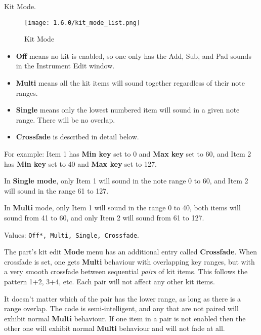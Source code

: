    Kit Mode.

\begin{figure}[H]
   \centering
   \texttt{[image: 1.6.0/kit\_mode\_list.png]}
   \caption{Kit Mode}
   \label{fig:kit_mode_list}
\end{figure}

   \begin{itemize}
      \item \textbf{Off} means no kit is enabled, so one only has the Add,
         Sub, and Pad sounds in the Instrument Edit window.
      \item \textbf{Multi} means all the kit items will sound together
         regardless of their note ranges.
      \item \textbf{Single} means only the lowest numbered item will sound
         in a given note range. There will be no overlap.
      \item \textbf{Crossfade} is described in detail below.
   \end{itemize}

   For example:
   Item 1 has \textbf{Min key} set to 0 and \textbf{Max key} set to 60, and
   Item 2 has \textbf{Min key} set to 40 and \textbf{Max key} set to 127.

   In \textbf{Single mode}, only Item 1 will sound in the note range 0 to
   60, and Item 2 will sound in the range 61 to 127.

   In \textbf{Multi} mode, only Item 1 will sound in the range 0 to 40, both
   items will sound from 41 to 60, and only Item 2 will sound from 61 to
   127.

   Values: \texttt{Off*, Multi, Single, Crossfade}.

   The part's kit edit \textbf{Mode} menu has an additional entry
   called \textbf{Crossfade}.
   When crossfade is set, one gets \textbf{Multi} behaviour with overlapping key
   ranges, but with a very smooth crossfade between sequential \textsl{pairs}
   of kit items. This follows the pattern 1+2, 3+4, etc. Each pair will not
   affect any other kit items.

   It doesn't matter which of the pair has the lower range, as long as there is
   a range overlap. The code is semi-intelligent, and any that are not paired
   will exhibit normal \textbf{Multi} behaviour. If one item in a pair is not
   enabled then the other one will exhibit normal \textbf{Multi} behaviour and
   will not fade at all.

